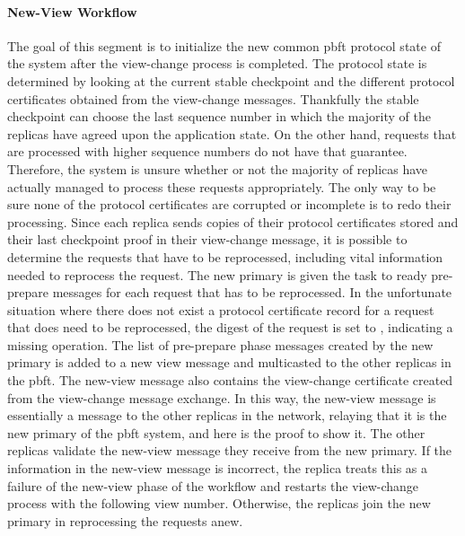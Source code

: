 \paragraph{New-View Workflow}
\vspace{1cm}
The goal of this segment is to initialize the new common \ac{pbft} protocol state of the system after the view-change process is completed. The protocol state is determined by looking at the current stable checkpoint and the different protocol certificates obtained from the view-change messages. Thankfully the stable checkpoint can choose the last sequence number in which the majority of the replicas have agreed upon the application state. On the other hand, requests that are processed with higher sequence numbers do not have that guarantee. Therefore, the system is unsure whether or not the majority of replicas have actually managed to process these requests appropriately. The only way to be sure none of the protocol certificates are corrupted or incomplete is to redo their processing. Since each replica sends copies of their protocol certificates stored and their last checkpoint proof in their view-change message, it is possible to determine the requests that have to be reprocessed, including vital information needed to reprocess the request. The new primary is given the task to ready pre-prepare messages for each request that has to be reprocessed. In the unfortunate situation where there does not exist a protocol certificate record for a request that does need to be reprocessed, the digest of the request is set to , indicating a missing operation. The list of pre-prepare phase messages created by the new primary is added to a new view message and multicasted to the other replicas in the \ac{pbft}. The new-view message also contains the view-change certificate created from the view-change message exchange. In this way, the new-view message is essentially a message to the other replicas in the network, relaying that it is the new primary of the \ac{pbft} system, and here is the proof to show it. The other replicas validate the new-view message they receive from the new primary. If the information in the new-view message is incorrect, the replica treats this as a failure of the new-view phase of the workflow and restarts the view-change process with the following view number. Otherwise, the replicas join the new primary in reprocessing the requests anew. 

